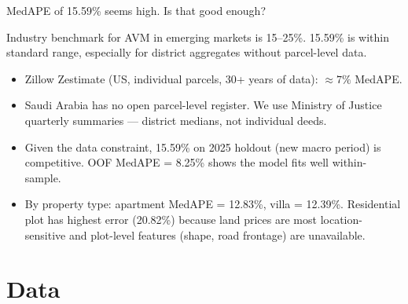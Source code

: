 \documentclass[11pt, a4paper, twoside]{article}
\begin{document}
\bigskip

\begin{question}{MedAPE of 15.59\% seems high. Is that good enough?}
\begin{shortanswer}
Industry benchmark for AVM in emerging markets is 15--25\%. 15.59\% is within
standard range, especially for district aggregates without parcel-level data.
\end{shortanswer}

\begin{detail}
\begin{itemize}
  \item Zillow Zestimate (US, individual parcels, 30+ years of data):
        $\approx 7\%$ MedAPE.
  \item Saudi Arabia has no open parcel-level register. We use Ministry of
        Justice quarterly summaries --- district medians, not individual deeds.
  \item Given the data constraint, 15.59\% on 2025 holdout (new macro period)
        is competitive. OOF MedAPE = 8.25\% shows the model fits well
        within-sample.
  \item By property type: apartment MedAPE = 12.83\%, villa = 12.39\%.
        Residential plot has highest error (20.82\%) because land prices are
        most location-sensitive and plot-level features (shape, road frontage)
        are unavailable.
\end{itemize}
\end{detail}
\end{question}

\section{Data}
\label{sec:data}
\end{document}
